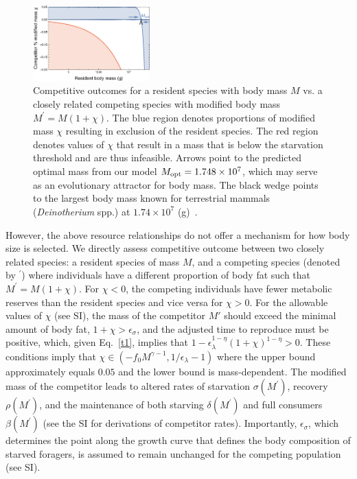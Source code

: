 \documentclass[twocolumn,preprintnumbers,amsmath,amssymb,superscriptaddress]{revtex4}
\begin{document}
\begin{figure}
\centering
\includegraphics[width=0.4\textwidth]{fig_Invasion.eps}
\caption{\small{Competitive outcomes for a resident species with body mass
    $M$ vs. a closely related competing species with modified body mass
    $M^\prime=M(1+\chi)$.  The blue region denotes proportions of modified
    mass $\chi$ resulting in exclusion of the resident species.  The red
    region denotes values of $\chi$ that result in a mass that is below the
    starvation threshold and are thus infeasible.  Arrows point to the
    predicted optimal mass from our model $M_{\rm opt}=1.748\times 10^7$,
    which may serve as an evolutionary attractor for body mass.  The black
    wedge points to the largest body mass known for terrestrial mammals
    (\emph{Deinotherium} spp.) at $1.74\times10^7$
    (g)~\citep{Smith:2010p3442}.}\label{fig:invasion}}
\end{figure}

 


However, the above resource relationships do not offer a mechanism for how
body size is selected.  We directly assess competitive outcome between two
closely related species: a resident species of mass $M$, and a competing
species (denoted by $^\prime$) where individuals have a different proportion
of body fat such that $M^\prime=M(1+\chi)$.  For $\chi < 0$, the competing
individuals have fewer metabolic reserves than the resident species and vice
versa for $\chi>0$.  For the allowable values of $\chi$ (see SI), the mass of
the competitor $M'$ should exceed the minimal amount of body fat,
$1+\chi>\epsilon_{\sigma}$, and the adjusted time to reproduce must be
positive, which, given Eq.~\ref{t1}, implies that
$1-\epsilon_{\lambda}^{1-\eta}\left(1+\chi\right)^{1-\eta}>0$.  These
conditions imply that $\chi\in(-f_0M^{\gamma-1},1/\epsilon_{\lambda}-1)$
where the upper bound approximately equals $0.05$ and the lower bound is
mass-dependent.  The modified mass of the competitor leads to altered rates
of starvation $\sigma(M^\prime)$, recovery $\rho(M^\prime)$, and the
maintenance of both starving $\delta(M^\prime)$ and full consumers
$\beta(M^\prime)$ (see the SI for derivations of competitor rates).
Importantly, $\epsilon_\sigma$, which determines the point along the growth
curve that defines the body composition of starved foragers, is assumed to
remain unchanged for the competing population (see SI).
\end{document}
